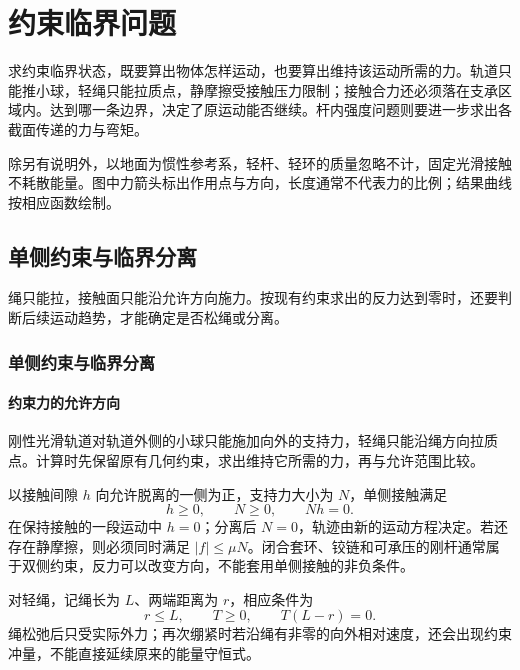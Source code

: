 \chapter{约束临界问题}


求约束临界状态，既要算出物体怎样运动，也要算出维持该运动所需的力。轨道只能推小球，轻绳只能拉质点，静摩擦受接触压力限制；接触合力还必须落在支承区域内。达到哪一条边界，决定了原运动能否继续。杆内强度问题则要进一步求出各截面传递的力与弯矩。

除另有说明外，以地面为惯性参考系，轻杆、轻环的质量忽略不计，固定光滑接触不耗散能量。图中力箭头标出作用点与方向，长度通常不代表力的比例；结果曲线按相应函数绘制。



\section{单侧约束与临界分离}

绳只能拉，接触面只能沿允许方向施力。按现有约束求出的反力达到零时，还要判断后续运动趋势，才能确定是否松绳或分离。



\subsection{单侧约束与临界分离}
\subsubsection{约束力的允许方向}
刚性光滑轨道对轨道外侧的小球只能施加向外的支持力，轻绳只能沿绳方向拉质点。计算时先保留原有几何约束，求出维持它所需的力，再与允许范围比较。

以接触间隙 $h$ 向允许脱离的一侧为正，支持力大小为 $N$，单侧接触满足
\[
h\ge0,\qquad N\ge0,\qquad Nh=0.
\]
在保持接触的一段运动中 $h=0$；分离后 $N=0$，轨迹由新的运动方程决定。若还存在静摩擦，则必须同时满足 $|f|\le\mu N$。闭合套环、铰链和可承压的刚杆通常属于双侧约束，反力可以改变方向，不能套用单侧接触的非负条件。

对轻绳，记绳长为 $L$、两端距离为 $r$，相应条件为
\[
r\le L,\qquad T\ge0,\qquad T(L-r)=0.
\]
绳松弛后只受实际外力；再次绷紧时若沿绳有非零的向外相对速度，还会出现约束冲量，不能直接延续原来的能量守恒式。

